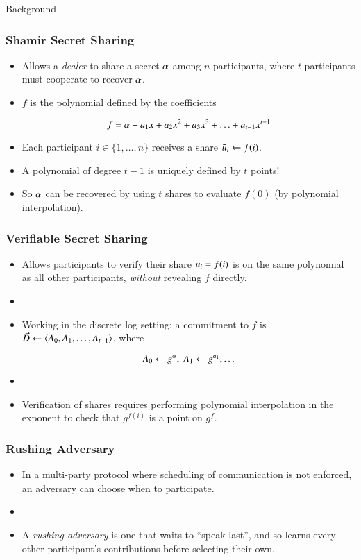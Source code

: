 \documentclass[hyperref={pdfpagelabels=true},table,dvipsnames,14pt,aspectratio=169]{beamer}
\begin{document}
\begin{frame}
  \huge
  \centering
  Background
\end{frame}

\begin{frame}
  \frametitle{Shamir Secret Sharing}

  \begin{itemize}
    \item<1-> Allows a \emph{dealer} to share a secret $\alpha$ among $n$ participants, where $t$ participants must cooperate to recover $\alpha$.
    \item<2-> $f$ is the polynomial defined by the coefficients

      \[f = \alpha + a_1 x + a_2 x^2 + a_3 x^3 + \ldots + a_{t-1}x^{t-1}  \]

    \item<3-> Each participant $i \in \{1, \ldots, n \}$ receives a share $\bar{u}_i \gets f(i) $.
    \item<4-> A polynomial of degree $t-1$ is uniquely defined by $t$ points!
    \item<5-> So $\alpha$ can be recovered by using $t$ shares to evaluate $f(0)$ (by polynomial interpolation).
  \end{itemize}
\end{frame}

\begin{frame}
  \frametitle{Verifiable Secret Sharing}

  \begin{itemize}
    \item<1-> Allows participants to verify their share $\bar{u}_i = f(i)$ is on the same polynomial as all other participants,
      \emph{without} revealing $f$ directly.
    \item[]
    \item<2-> Working in the discrete log setting: a commitment to $f$ is $\vec{D} \gets \langle A_0, A_1, \ldots, A_{t-1}  \rangle$, where

      \[ A_0 \gets g^{\alpha},\ A_1 \gets g^{a_1}, \ldots \]
    \item[]
    \item<3-> Verification of shares requires performing polynomial interpolation in the exponent to check that $g^{f(i)}$ is a point on $g^f$.
  \end{itemize}
\end{frame}

\begin{frame}
  \frametitle{Rushing Adversary}

  \begin{itemize}
    \item<1-> In a multi-party protocol where scheduling of communication is not enforced, an adversary can choose when to participate.
    \item[]
    \item<2-> A \emph{rushing adversary} is one that waits to ``speak last'', and so learns every other participant's contributions before selecting their own.
  \end{itemize}
\end{frame}
\end{document}
